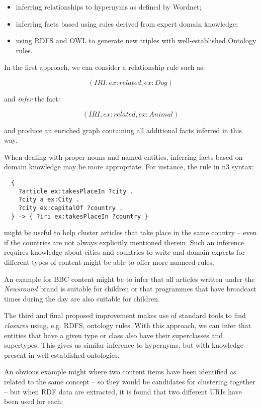 \begin{itemize}
\item inferring relationships to hypernyms as defined by Wordnet\cite{miller1995wordnet};
\item inferring facts based using rules derived from expert domain knowledge;
\item using RDFS and OWL to generate new triples with well-established Ontology rules.
\end{itemize}

In the first approach, we can consider a relationship rule such as:

$$
(IRI, ex:related, ex:Dog)
$$

\noindent and \emph{infer} the fact:

$$
(IRI, ex:related, ex:Animal)
$$

\noindent and produce an enriched graph containing all additional facts
inferred in this way.

When dealing with proper nouns and named entities, inferring facts based on
domain knowledge may be more appropriate. For instance, the rule in n3 syntax:

\begin{lstlisting}
  {
    ?article ex:takesPlaceIn ?city .
    ?city a ex:City .
    ?city ex:capitalOf ?country .
  } -> { ?iri ex:takesPlaceIn ?country }
\end{lstlisting}

\noindent might be useful to help cluster articles that take place in the same
country -- even if the countries are not always explicitly mentioned therein.
Such an inference requires knowledge about cities and countries to
write and domain experts for different types of content might be able to offer
more nuanced rules.

An example for BBC content might be to infer that all articles written under
the \emph{Newsround} brand is suitable for children or that programmes that
have broadcast times during the day are also suitable for children.

The third and final proposed improvement makes use of standard tools to find
\emph{closures} using, e.g. RDFS, ontology rules. With this approach, we
can infer that entities that have a given type or class also have their
superclasses and supertypes. This gives us similar inference to hypernyms,
but with knowledge present in well-established ontologies.

An obvious example might where two content items have been identified as
related to the same concept -- so they would be candidates for clustering
together -- but when RDF data are extracted, it is found that two
different URIs have been used for each:


